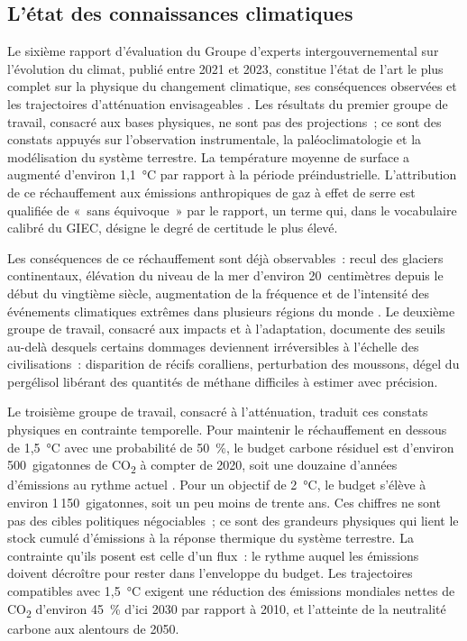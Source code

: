 \subsection{L'état des connaissances climatiques}\label{subsec:climat}

Le sixième rapport d'évaluation du Groupe d'experts intergouvernemental sur l'évolution du climat, publié entre 2021 et 2023, constitue l'état de l'art le plus complet sur la physique du changement climatique, ses conséquences observées et les trajectoires d'atténuation envisageables \parencite{ipcc_ar6_wg1_2021, ipcc_ar6_wg2_2022, ipcc_ar6_wg3_2022}. Les résultats du premier groupe de travail, consacré aux bases physiques, ne sont pas des projections~; ce sont des constats appuyés sur l'observation instrumentale, la paléoclimatologie et la modélisation du système terrestre. La température moyenne de surface a augmenté d'environ 1,1~°C par rapport à la période préindustrielle. L'attribution de ce réchauffement aux émissions anthropiques de gaz à effet de serre est qualifiée de «~sans équivoque~» par le rapport, un terme qui, dans le vocabulaire calibré du GIEC, désigne le degré de certitude le plus élevé.

Les conséquences de ce réchauffement sont déjà observables~: recul des glaciers continentaux, élévation du niveau de la mer d'environ 20~centimètres depuis le début du vingtième siècle, augmentation de la fréquence et de l'intensité des événements climatiques extrêmes dans plusieurs régions du monde \parencite{ipcc_ar6_wg2_2022}. Le deuxième groupe de travail, consacré aux impacts et à l'adaptation, documente des seuils au-delà desquels certains dommages deviennent irréversibles à l'échelle des civilisations~: disparition de récifs coralliens, perturbation des moussons, dégel du pergélisol libérant des quantités de méthane difficiles à estimer avec précision.

Le troisième groupe de travail, consacré à l'atténuation, traduit ces constats physiques en contrainte temporelle. Pour maintenir le réchauffement en dessous de 1,5~°C avec une probabilité de 50~\%, le budget carbone résiduel est d'environ 500~gigatonnes de CO\textsubscript{2} à compter de 2020, soit une douzaine d'années d'émissions au rythme actuel \parencite{ipcc_ar6_wg3_2022}. Pour un objectif de 2~°C, le budget s'élève à environ 1\,150~gigatonnes, soit un peu moins de trente ans. Ces chiffres ne sont pas des cibles politiques négociables~; ce sont des grandeurs physiques qui lient le stock cumulé d'émissions à la réponse thermique du système terrestre. La contrainte qu'ils posent est celle d'un flux~: le rythme auquel les émissions doivent décroître pour rester dans l'enveloppe du budget. Les trajectoires compatibles avec 1,5~°C exigent une réduction des émissions mondiales nettes de CO\textsubscript{2} d'environ 45~\% d'ici 2030 par rapport à 2010, et l'atteinte de la neutralité carbone aux alentours de 2050.

